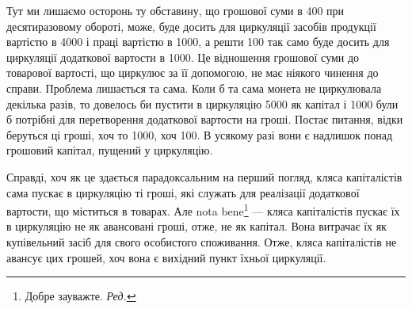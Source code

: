 Тут ми лишаємо осторонь ту обставину, що грошової суми в 400 при десятиразовому обороті, може, буде досить для циркуляції
засобів продукції вартістю в 4000 і праці вартістю в 1000, а решти 100 так само буде досить для циркуляції додаткової
вартости в 1000. Це відношення грошової суми до товарової
вартості, що циркулює за її допомогою, не має ніякого чинення до
справи. Проблема лишається та сама. Коли б та сама монета не циркулювала
декілька разів, то довелось би пустити в циркуляцію 5000
як капітал і 1000 були б потрібні для перетворення додаткової
вартости на гроші. Постає питання, відки беруться ці гроші, хоч то
1000, хоч 100. В усякому разі вони є надлишок понад
грошовий капітал, пущений у циркуляцію.

Справді, хоч як це здається парадоксальним на перший погляд, кляса
капіталістів сама пускає в циркуляцію ті гроші, які служать для реалізації
додаткової вартости, що міститься в товарах. Але nota bene\footnote*{
Добре зауважте. \emph{Ред.}
} — кляса
капіталістів пускає їх в циркуляцію не як авансовані гроші, отже, не як
капітал. Вона витрачає їх як купівельний засіб для свого особистого
споживання. Отже, кляса капіталістів не авансує цих грошей, хоч вона
є вихідний пункт їхньої циркуляції.

